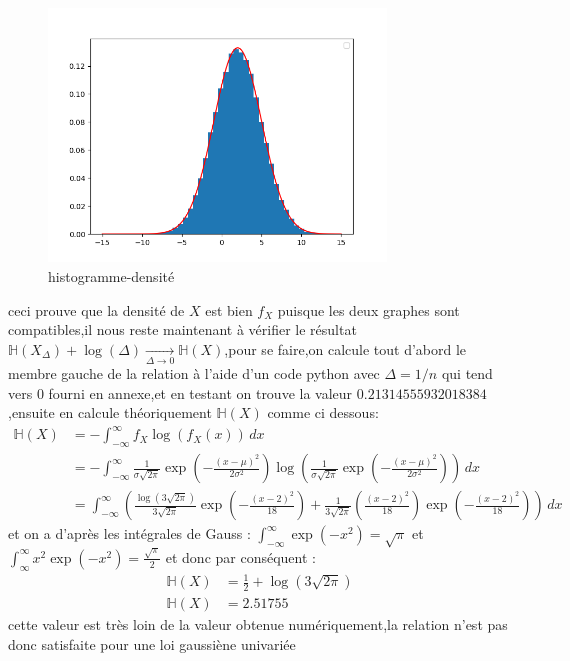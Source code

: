 \documentclass[a4paper]{article}
\begin{document}
\begin{figure}[h]
  \centering
  \includegraphics[width=0.8\textwidth]{Figure_1.png}
  \caption{histogramme-densité}
\end{figure}
ceci prouve que la densité de $X$ est bien $f_X$ puisque les deux graphes sont compatibles,il nous reste maintenant à vérifier le résultat$\mathbb{H}(X_\Delta)+\log(\Delta)\underset{\Delta \rightarrow 0}{\rightarrow}\mathbb{H}(X)$,pour se faire,on calcule tout d'abord le membre gauche de la relation à l'aide d'un code python avec $\Delta=1/n$ qui tend vers 0 fourni en annexe,et en testant on trouve la valeur $0.21314555932018384$,ensuite en calcule théoriquement $\mathbb{H}(X)$ comme ci dessous:
\begin{align*}
  \mathbb{H}(X) &= -\int_{-\infty}^{\infty}f_{X}\log(f_X(x))\,dx \\
  &= -\int_{-\infty}^{\infty}\frac{1}{\sigma\sqrt{2\pi}}\exp\left(-\frac{(x-\mu)^{2}}{2\sigma^2}\right)\log\left(\frac{1}{\sigma\sqrt{2\pi}}\exp\left(-\frac{(x-\mu)^{2}}{2\sigma^2}\right)\right)\,dx \\
  &= \int_{-\infty}^{\infty}\left(\frac{\log(3\sqrt{2\pi})}{3\sqrt{2\pi}}\exp\left(-\frac{(x-2)^2}{18}\right) + \frac{1}{3\sqrt{2\pi}}\left(\frac{(x-2)^2}{18}\right)\exp\left(-\frac{(x-2)^2}{18}\right)\right)\,dx
\end{align*}
et on a d'après les intégrales de Gauss : $\int_{-\infty}^{\infty}\exp(-x^2)=\sqrt{\pi}$ et $\int_{\infty}^{\infty}x^2\exp(-x^2)=\frac{\sqrt{\pi}}{2}$ et donc par conséquent : 
\begin{align*}
  \mathbb{H}(X) &= \frac{1}{2}+\log(3\sqrt{2\pi})\\
  \mathbb{H}(X) &= 2.51755
\end{align*}
cette valeur est très loin de la valeur obtenue numériquement,la relation n'est pas donc satisfaite pour une loi gaussiène univariée
\end{document}
